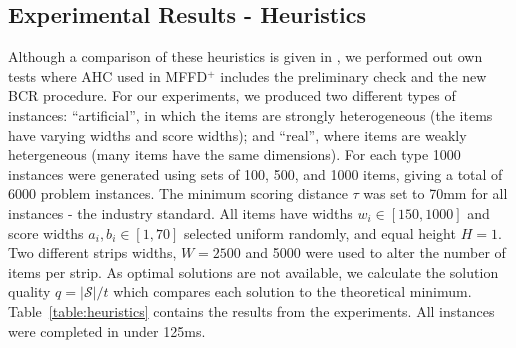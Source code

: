 \documentclass{elsarticle}
\begin{document}
\subsection{Experimental Results - Heuristics}
\label{sub:expheuristics}
\noindent Although a comparison of these heuristics is given in \cite{hawa2018}, we performed out own tests where AHC used in MFFD$^+$ includes the preliminary check and the new BCR procedure. For our experiments, we produced two different types of instances: ``artificial'', in which the items are strongly heterogeneous (the items have varying widths and score widths); and ``real'', where items are weakly hetergeneous (many items have the same dimensions). For each type 1000 instances were generated using sets of 100, 500, and 1000 items, giving a total of 6000 problem instances. The minimum scoring distance $\tau$ was set to 70mm for all instances - the industry standard. All items have widths $w_i \in [150,1000]$ and score widths $a_i, b_i \in [1,70]$ selected uniform randomly, and equal height $H=1$. Two different strips widths, $W = 2500$ and 5000 were used to alter the number of items per strip. As optimal solutions are not available, we calculate the solution quality $q = |\mathcal{S}|/ t$ which compares each solution to the theoretical minimum. Table~\ref{table:heuristics} contains the results from the experiments. All instances were completed in under 125ms.
\end{document}
